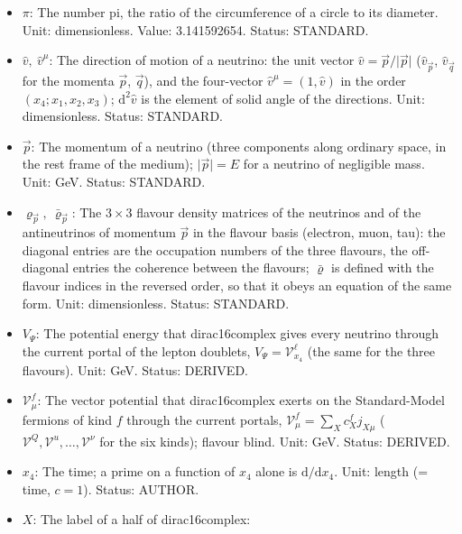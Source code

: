 \documentclass[
  10pt,
]{article}
\begin{document}
\begin{itemize}
  \(\vec q\): The momentum of another neutrino of the medium (the
  integration variable of the neutrino-neutrino potential);
  \(\mathrm{d}^3\vec q\) its volume element. Unit: GeV. Status:
  STANDARD.
\item
  \(\pi\): The number pi, the ratio of the circumference of a circle to
  its diameter. Unit: dimensionless. Value: 3.141592654. Status:
  STANDARD.
\item
  \(\hat v,\ \hat v^\mu\): The direction of motion of a neutrino: the
  unit vector \(\hat v = \vec p/\lvert\vec p\rvert\)
  (\(\hat v_{\vec p}\), \(\hat v_{\vec q}\) for the momenta \(\vec p\),
  \(\vec q\)), and the four-vector \(\hat v^\mu = (1, \hat v)\) in the
  order \((x_4; x_1, x_2, x_3)\); \(\mathrm{d}^2\hat v\) is the element
  of solid angle of the directions. Unit: dimensionless. Status:
  STANDARD.
\item
  \(\vec p\): The momentum of a neutrino (three components along
  ordinary space, in the rest frame of the medium);
  \(\lvert\vec p\rvert = E\) for a neutrino of negligible mass. Unit:
  GeV. Status: STANDARD.
\item
  \(\varrho_{\vec p},\ \bar\varrho_{\vec p}\): The \(3 \times 3\)
  flavour density matrices of the neutrinos and of the antineutrinos of
  momentum \(\vec p\) in the flavour basis (electron, muon, tau): the
  diagonal entries are the occupation numbers of the three flavours, the
  off-diagonal entries the coherence between the flavours;
  \(\bar\varrho\) is defined with the flavour indices in the reversed
  order, so that it obeys an equation of the same form. Unit:
  dimensionless. Status: STANDARD.
\item
  \(V_\Psi\): The potential energy that dirac16complex gives every
  neutrino through the current portal of the lepton doublets,
  \(V_\Psi = \mathcal{V}^{\ell}_{x_4}\) (the same for the three
  flavours). Unit: GeV. Status: DERIVED.
\item
  \(\mathcal{V}^{f}_\mu\): The vector potential that dirac16complex
  exerts on the Standard-Model fermions of kind \(f\) through the
  current portals, \(\mathcal{V}^{f}_\mu = \sum_Xc^{f}_Xj_{X\mu}\)
  (\(\mathcal{V}^{Q}, \mathcal{V}^{u}, \dots, \mathcal{V}^{\nu}\) for
  the six kinds); flavour blind. Unit: GeV. Status: DERIVED.
\item
  \(x_4\): The time; a prime on a function of \(x_4\) alone is
  \(\mathrm{d}/\mathrm{d}x_4\). Unit: length (= time, \(c = 1\)).
  Status: AUTHOR.
\item
  \(X\): The label of a half of dirac16complex:

\end{itemize}
\end{document}
